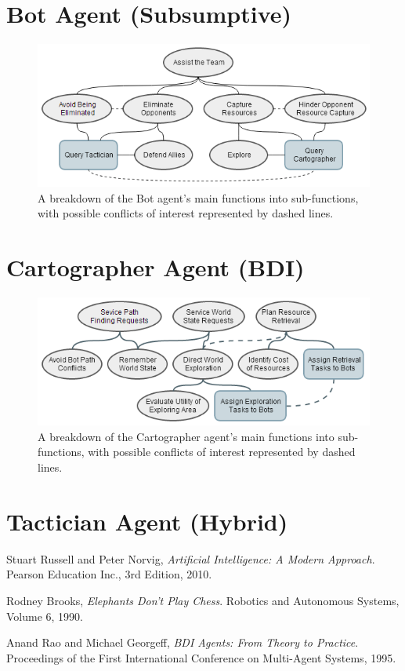 \documentclass[a4paper,10pt]{article}
\begin{document}
\section{Bot Agent (Subsumptive)}
\begin{figure}[ht]
  \centering
  \includegraphics[width=0.7\linewidth]{bot}
  \begin{minipage}[t]{0.8\textwidth}
    \caption{A breakdown of the Bot agent's main functions into sub-functions, with possible conflicts of interest represented by dashed lines.}
  \end{minipage}
\end{figure}

\section{Cartographer Agent (BDI)}
\begin{figure}[ht]
  \centering
  \includegraphics[width=0.7\linewidth]{cartographer}
  \begin{minipage}[t]{0.8\textwidth}
    \caption{A breakdown of the Cartographer agent's main functions into sub-functions, with possible conflicts of interest represented by dashed lines.}
  \end{minipage}
\end{figure}

\section{Tactician Agent (Hybrid)}

\begin{thebibliography}{9}
    Stuart Russell and Peter Norvig,
    \emph{Artificial Intelligence: A Modern Approach}. \newline
    Pearson Education Inc.,
    3rd Edition,
    2010.

    Rodney Brooks,
    \emph{Elephants Don't Play Chess}. \newline
    Robotics and Autonomous Systems,
    Volume 6,
    1990.

    Anand Rao and Michael Georgeff,
    \emph{BDI Agents: From Theory to Practice}. \newline
    Proceedings of the First International Conference on Multi-Agent Systems,
    1995.
\end{thebibliography}
\end{document}
